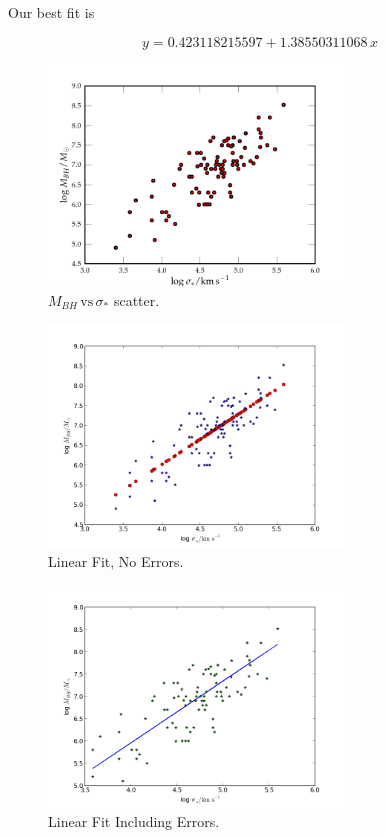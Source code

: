 \documentclass[11pt,letterpaper]{article}
\begin{document}
Our best fit is 

\begin{equation}
y= 0.423118215597+ 1.38550311068\, x
\end{equation}

\begin{figure}[bth]
\centering
\includegraphics[width=0.7\textwidth]{ws5afig.png}
\caption{$M_{BH}\, \mathrm{vs}\, \sigma_*$ scatter.}
\label{fig:1}
\end{figure}

\begin{figure}[bth]
\centering
\includegraphics[width=0.7\textwidth]{ws5bfig.png}
\caption{Linear Fit, No Errors.}
\label{fig:2}
\end{figure}

\begin{figure}[bth]
\centering
\includegraphics[width=0.7\textwidth]{ws5cfig.png}
\caption{Linear Fit Including Errors.}
\label{fig:3}
\end{figure}
\end{document}
